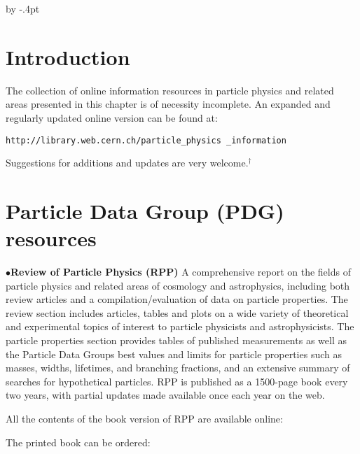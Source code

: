 \advance\baselineskip by -.4pt


\parindent=0pt
\medskip

\section{Introduction}%

The collection of online information resources in particle physics and related areas presented in this chapter is of necessity incomplete. An expanded and regularly updated online version can be found at: 
	
	\item{}{\tt http://library.web.cern.ch/particle\_physics\break
\qquad\qquad\_information}

Suggestions for additions and updates are very welcome.$^\dagger$ 


\section{Particle Data Group (PDG) resources}%

\item{$\bullet$}{\bf Review of Particle Physics (RPP)}
A comprehensive report on the fields of particle physics and related areas of cosmology and astrophysics, including both review articles and a compilation/evaluation of data on particle properties. The review section includes articles, tables and plots on a wide variety of theoretical and experimental topics of interest to particle physicists and astrophysicists. The particle properties section provides tables of published measurements as well as the Particle Data Groups best values and limits for particle properties such as masses, widths, lifetimes, and branching fractions, and an extensive summary of searches for hypothetical particles. RPP is published as a 1500-page book every two years, with partial updates made available once each year on the web.
\overfullrule 0pt

\item{} All the contents of the book version of RPP are available online:

         \item{}

\item{} The printed book can be ordered:

         \item{}

